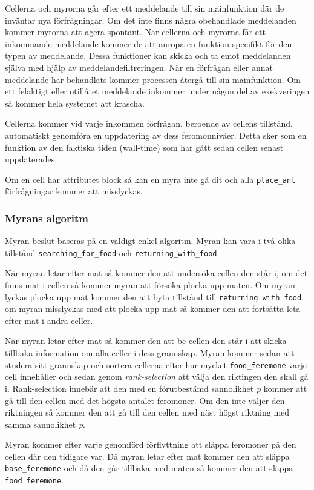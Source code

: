 \documentclass[12pt]{article}
\begin{document}
Cellerna och myrorna går efter ett meddelande till sin mainfunktion där de inväntar nya förfrågningar.
Om det inte finns några obehandlade meddelanden kommer myrorna att agera spontant.
När cellerna och myrorna får ett inkommande meddelande kommer de att anropa en funktion specifikt för den typen av meddelande.
Dessa funktioner kan skicka och ta emot meddelanden själva med hjälp av meddelandefiltreringen.
När en förfrågan eller annat meddelande har behandlats kommer processen återgå till sin mainfunktion.
Om ett felaktigt eller otillåtet meddelande inkommer under någon del av exekveringen så kommer hela systemet att krascha.

Cellerna kommer vid varje inkommen förfrågan,
beroende av cellens tillstånd,
automatiskt genomföra en uppdatering av dess feromonnivåer.
Detta sker som en funktion av den faktiska tiden (wall-time) som har gått sedan cellen senast uppdaterades.

Om en cell har attributet block så kan en myra inte gå dit och alla \texttt{place\_ant} förfrågningar kommer att misslyckas.

\subsubsection{Myrans algoritm}
Myran beslut baseras på en väldigt enkel algoritm.
Myran kan vara i två olika tillstånd \texttt{searching\_for\_food} och \texttt{returning\_with\_food}.

När myran letar efter mat så kommer den att undersöka cellen den står i,
om det finns mat i cellen så kommer myran att försöka plocka upp maten.
Om myran lyckas plocka upp mat kommer den att byta tillstånd till \texttt{returning\_with\_food},
om myran misslyckas med att plocka upp mat så kommer den att fortsätta leta efter mat i andra celler.

När myran letar efter mat så kommer den att be cellen den står i att skicka tillbaka information om alla celler i dess grannskap.
Myran kommer sedan att studera sitt grannskap och sortera cellerna efter hur mycket \texttt{food\_feremone} varje cell innehåller och sedan genom \textit{rank-selection} att välja den riktingen den skall gå i.
Rank-selection innebär att den med en förutbestämd sannolikhet \textit{p} kommer att gå till den cellen med det högsta antalet feromoner.
Om den inte väljer den riktningen så kommer den att gå till den cellen med näst högst riktning med samma sannolikhet \textit{p}.

Myran kommer efter varje genomförd förflyttning att släppa feromoner på den cellen där den tidigare var.
Då myran letar efter mat kommer den att släppa \texttt{base\_feremone} och då den går tillbaka med maten så kommer den att släppa \texttt{food\_feremone}.
\end{document}
